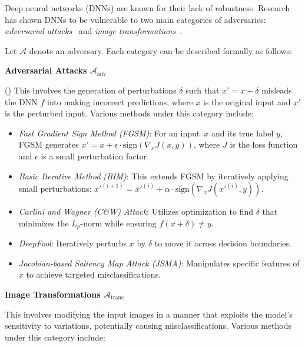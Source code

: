 Deep neural networks (DNNs) are known for their lack of robustness. Research has shown DNNs to be vulnerable to two main categories of adversaries: \emph{adversarial attacks}~\cite{adv_attacks} and \emph{image transformations}~\cite{deeptest}.

Let $\mathcal{A}$ denote an adversary. Each category can be described formally as follows:

\smallskip\noindent%
\textbf{Adversarial Attacks $\mathcal{A}_{\text{adv}}$}

(\adv) This involves the generation of perturbations $\delta$ such that $x' = x + \delta$ misleads the DNN $f$ into making incorrect predictions, where $x$ is the original input and $x'$ is the perturbed input. Various methods under this category include:

\begin{itemize}
    \item \emph{Fast Gradient Sign Method (FGSM)}: For an input~$x$ and its true label $y$, FGSM generates $x' = x + \epsilon \cdot \text{sign}(\nabla_x J(x, y))$, where $J$ is the loss function and $\epsilon$ is a small perturbation factor.
    \item \emph{Basic Iterative Method (BIM)}: This extends FGSM by iteratively applying small perturbations: $x'^{(i+1)} = x'^{(i)} + \alpha \cdot \text{sign}(\nabla_x J(x'^{(i)}, y))$.
    \item \emph{Carlini and Wagner (C\&W) Attack}: Utilizes optimization to find $\delta$ that minimizes the $L_p$-norm while ensuring $f(x + \delta) \neq y$.
    \item \emph{DeepFool}: Iteratively perturbs $x$ by $\delta$ to move it across decision boundaries.
    \item \emph{Jacobian-based Saliency Map Attack (JSMA)}: Manipulates specific features of $x$ to achieve targeted misclassifications.
\end{itemize}

\smallskip\noindent%
\textbf{Image Transformations $\mathcal{A}_{\text{trans}}$}

This involves modifying the input images in a manner that exploits the model's sensitivity to variations, potentially causing misclassifications. Various methods under this category include:

